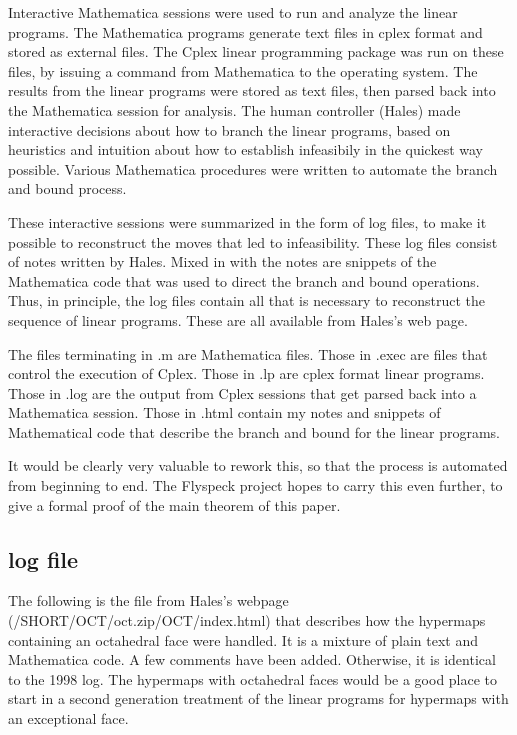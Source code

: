 Interactive Mathematica sessions were used to run and analyze the
linear programs.  The Mathematica programs generate text files in
cplex format and stored as external files. The Cplex linear
programming package was run on these files, by issuing a command
from Mathematica to the operating system.  The results from the
linear programs were stored as text files, then parsed back into
the Mathematica session for analysis.  The human controller
(Hales) made interactive decisions about how to branch the linear
programs, based on heuristics and intuition about how to establish
infeasibily in the quickest way possible.  Various Mathematica
procedures were written to automate the branch and bound process.

These interactive sessions were summarized in the form of log
files, to make it possible to reconstruct the moves that led to
infeasibility. These log files consist of notes written by Hales.
Mixed in with the notes are snippets of the Mathematica code that
was used to direct the branch and bound operations.  Thus, in
principle, the log files contain all that is necessary to
reconstruct the sequence of linear programs.  These are all
available from Hales's web page.

The files terminating in .m are Mathematica files.  Those in .exec
are files that control the execution of Cplex.  Those in .lp are
cplex format linear programs.  Those in .log are the output from
Cplex sessions that get parsed back into a Mathematica session.
Those in .html contain my notes and snippets of Mathematical code
that describe the branch and bound for the linear programs.

It would be clearly very valuable to rework this, so that the
process is automated from beginning to end.  The Flyspeck project
hopes to carry this even further, to give a formal proof of the
main theorem of this paper.

\subsection{log file}

The following is the file from Hales's webpage
(/SHORT/OCT/oct.zip/OCT/index.html) that describes how the
hypermaps containing an octahedral face were handled.  It is a
mixture of plain text and Mathematica code.  A few comments have
been added.  Otherwise, it is identical to the 1998 log.  The
hypermaps with octahedral faces would be a good place to start in
a second generation treatment of the linear programs for hypermaps
with an exceptional face.

